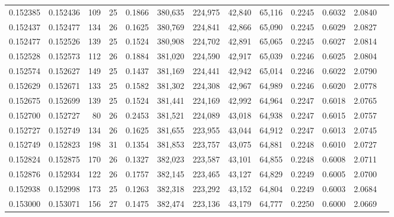 \begin{tabular}{rrrrrrrrrrrrr}
0.152385 & 0.152436 & 109 &  25 &                                     0.1866 & 380,635 & 224,975 &  42,840 &  65,116 & 0.2245 & 0.6032 & 2.0840 \\
0.152437 & 0.152477 & 134 &  26 &                                     0.1625 & 380,769 & 224,841 &  42,866 &  65,090 & 0.2245 & 0.6029 & 2.0827 \\
0.152477 & 0.152526 & 139 &  25 &                                     0.1524 & 380,908 & 224,702 &  42,891 &  65,065 & 0.2245 & 0.6027 & 2.0814 \\
0.152528 & 0.152573 & 112 &  26 &                                     0.1884 & 381,020 & 224,590 &  42,917 &  65,039 & 0.2246 & 0.6025 & 2.0804 \\
0.152574 & 0.152627 & 149 &  25 &                                     0.1437 & 381,169 & 224,441 &  42,942 &  65,014 & 0.2246 & 0.6022 & 2.0790 \\
0.152629 & 0.152671 & 133 &  25 &                                     0.1582 & 381,302 & 224,308 &  42,967 &  64,989 & 0.2246 & 0.6020 & 2.0778 \\
0.152675 & 0.152699 & 139 &  25 &                                     0.1524 & 381,441 & 224,169 &  42,992 &  64,964 & 0.2247 & 0.6018 & 2.0765 \\
0.152700 & 0.152727 &  80 &  26 &                                     0.2453 & 381,521 & 224,089 &  43,018 &  64,938 & 0.2247 & 0.6015 & 2.0757 \\
0.152727 & 0.152749 & 134 &  26 &                                     0.1625 & 381,655 & 223,955 &  43,044 &  64,912 & 0.2247 & 0.6013 & 2.0745 \\
0.152749 & 0.152823 & 198 &  31 &                                     0.1354 & 381,853 & 223,757 &  43,075 &  64,881 & 0.2248 & 0.6010 & 2.0727 \\
0.152824 & 0.152875 & 170 &  26 &                                     0.1327 & 382,023 & 223,587 &  43,101 &  64,855 & 0.2248 & 0.6008 & 2.0711 \\
0.152876 & 0.152934 & 122 &  26 &                                     0.1757 & 382,145 & 223,465 &  43,127 &  64,829 & 0.2249 & 0.6005 & 2.0700 \\
0.152938 & 0.152998 & 173 &  25 &                                     0.1263 & 382,318 & 223,292 &  43,152 &  64,804 & 0.2249 & 0.6003 & 2.0684 \\
0.153000 & 0.153071 & 156 &  27 &                                     0.1475 & 382,474 & 223,136 &  43,179 &  64,777 & 0.2250 & 0.6000 & 2.0669 \\

\end{tabular}

